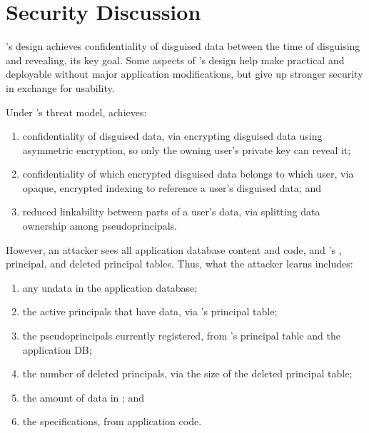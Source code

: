 
\section{Security Discussion}
\label{s:eval-security}

%
%
\sys's design achieves confidentiality of disguised data between the time of
disguising and revealing, its key goal.
%
Some aspects of \sys's design help make \sys practical and deployable without
major application modifications, but give up stronger security in exchange for
usability.
%

%
Under \sys's threat model, \sys achieves:
\begin{enumerate}[nosep]
    \item confidentiality of disguised data, via encrypting disguised data using asymmetric encryption, so only the owning user’s private key can reveal it;
    \item confidentiality of which encrypted disguised data belongs to which
        user, via opaque, encrypted indexing to reference a user’s disguised data; and
    \item reduced linkability between parts of a user's data, via splitting data ownership among pseudoprincipals.
\end{enumerate}
%
However, an attacker sees all application database
content and code, and \sys's \xx, principal, and deleted principal tables.
%
Thus, what the attacker learns includes:
\begin{enumerate}[nosep]
  \item any un\xxed data in the application database;
  \item the active principals that have \xxed data, via \sys's principal
      table;
  \item the pseudoprincipals currently registered, from \sys's
    principal table and the application DB;
  \item the number of deleted principals, via the size of the deleted
    principal table;
  \item the amount of \xxed data in \sys; and
  \item the \xx specifications, from application code.
\end{enumerate}

